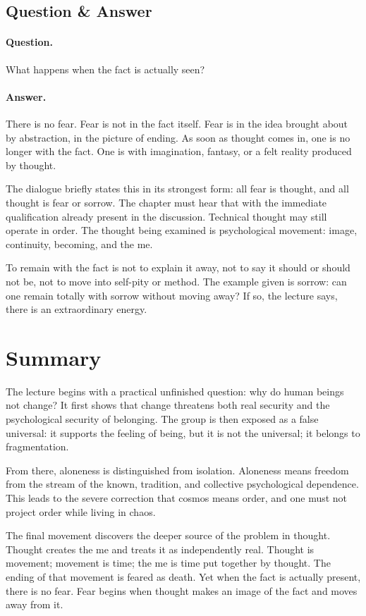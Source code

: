 \subsection{Question \& Answer}

\paragraph{Question.}
What happens when the fact is actually seen?

\paragraph{Answer.}
There is no fear. Fear is not in the fact itself. Fear is in the idea brought about by abstraction, in the picture of ending. As soon as thought comes in, one is no longer with the fact. One is with imagination, fantasy, or a felt reality produced by thought.

The dialogue briefly states this in its strongest form: all fear is thought, and all thought is fear or sorrow. The chapter must hear that with the immediate qualification already present in the discussion. Technical thought may still operate in order. The thought being examined is psychological movement: image, continuity, becoming, and the me.

To remain with the fact is not to explain it away, not to say it should or should not be, not to move into self-pity or method. The example given is sorrow: can one remain totally with sorrow without moving away? If so, the lecture says, there is an extraordinary energy.

\section{Summary}

The lecture begins with a practical unfinished question: why do human beings not change? It first shows that change threatens both real security and the psychological security of belonging. The group is then exposed as a false universal: it supports the feeling of being, but it is not the universal; it belongs to fragmentation.

From there, aloneness is distinguished from isolation. Aloneness means freedom from the stream of the known, tradition, and collective psychological dependence. This leads to the severe correction that cosmos means order, and one must not project order while living in chaos.

The final movement discovers the deeper source of the problem in thought. Thought creates the me and treats it as independently real. Thought is movement; movement is time; the me is time put together by thought. The ending of that movement is feared as death. Yet when the fact is actually present, there is no fear. Fear begins when thought makes an image of the fact and moves away from it.